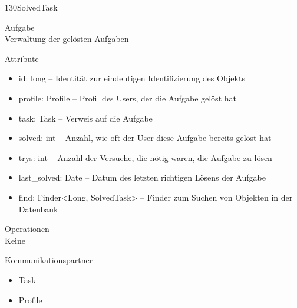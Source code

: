 \newpage
\begin{class}{130}{SolvedTask}
\item[Aufgabe]~\\
Verwaltung der gelösten Aufgaben
\item[Attribute]~\\
\begin{itemize}
\item id: long -- Identität zur eindeutigen Identifizierung des Objekts
\item profile: Profile -- Profil des Users, der die Aufgabe gelöst hat
\item task: Task -- Verweis auf die Aufgabe
\item solved: int -- Anzahl, wie oft der User diese Aufgabe bereits gelöst hat
\item trys: int -- Anzahl der Versuche, die nötig waren, die Aufgabe zu lösen
\item last\_solved: Date -- Datum des letzten richtigen Lösens der Aufgabe
\item find: Finder<Long, SolvedTask> -- Finder zum Suchen von Objekten in der Datenbank
\end{itemize}
\item[Operationen]~\\
Keine
\item[Kommunikationspartner]~\\
\begin{itemize}
\item Task
\item Profile
\end{itemize}
\end{class}

